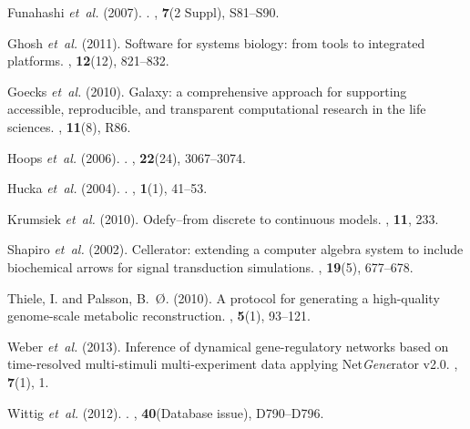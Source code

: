 \documentclass{bioinfo}
\begin{document}
\begin{thebibliography}{}

Funahashi {\em et~al.} (2007).
.
, {\bf 7}(2 Suppl), S81--S90.

Ghosh {\em et~al.} (2011).
\newblock Software for systems biology: from tools to integrated platforms.
, {\bf 12}(12), 821--832.

Goecks {\em et~al.} (2010).
\newblock Galaxy: a comprehensive approach for supporting accessible,
  reproducible, and transparent computational research in the life sciences.
, {\bf 11}(8), R86.

Hoops {\em et~al.} (2006).
.
\newblock {\em \Bioinformatics\/}, {\bf 22}(24), 3067--3074.

Hucka {\em et~al.} (2004).
.
, {\bf 1}(1), 41--53.

Krumsiek {\em et~al.} (2010).
\newblock Odefy--from discrete to continuous models.
, {\bf 11}, 233.

Shapiro {\em et~al.} (2002).
\newblock Cellerator: extending a computer algebra system to include
  biochemical arrows for signal transduction simulations.
\newblock {\em \Bioinformatics\/}, {\bf 19}(5), 677--678.

Thiele, I. and Palsson, B.~{\O}. (2010).
\newblock A protocol for generating a high-quality genome-scale metabolic
  reconstruction.
, {\bf 5}(1), 93--121.

Weber {\em et~al.} (2013).
\newblock Inference of dynamical gene-regulatory networks based on
  time-resolved multi-stimuli multi-experiment data applying Net\emph{Gene}rator v2.0.
, {\bf 7}(1), 1.

Wittig {\em et~al.} (2012).
.
, {\bf 40}(Database issue), D790--D796.

\end{thebibliography}
\end{document}
